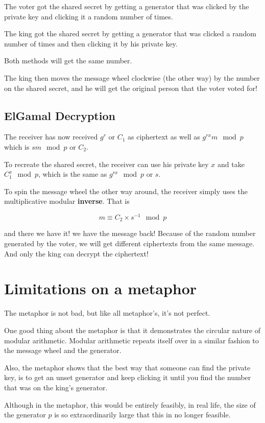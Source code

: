\documentclass{article}
\begin{document}
  The voter got the shared secret by getting a generator that was clicked by
  the private key and clicking it a random number of times.

  The king got the shared secret by getting a generator that was clicked a 
  random number of times and then clicking it by his private key.

  Both methods will get the same number.

  The king then moves the message wheel clockwise (the other way) by the number on the shared
  secret, and he will get the original person that the voter voted for!

  \subsection*{ElGamal Decryption}
  The receiver has now received $g^r$ or $C_1$ as ciphertext as well as $g^{rx} m \mod p$
  which is $sm \mod p$ or $C_2$.

  To recreate the shared secret, the receiver can use his private key $x$ and
  take $C_1^x \mod p$, which is the same as $g^{rx} \mod p$ or $s$.
  
  To spin the message wheel the other way around, the receiver simply uses the
  multiplicative modular \textbf{inverse}. That is

  \[ m \equiv C_2 \times s^{-1} \mod p \]

  and there we have it! we have the message back! Because of the random number
  generated by the voter, we will get different ciphertexts from the same message.
  And only the king can decrypt the ciphertext!

  \section*{Limitations on a metaphor}
  The metaphor is not bad, but like all metaphor's, it's not perfect.
  
  One good thing about the metaphor is that it demonstrates the circular nature
  of modular arithmetic. Modular arithmetic repeats itself over in a similar 
  fashion to the message wheel and the generator.
  
  Also, the metaphor shows that the
  best way that someone can find the private key, is to get an unset generator
  and keep clicking it until you find the number that was on the king's generator.

  Although in the metaphor, this would be entirely feasibly, in real life, the
  size of the generator $p$ is so extraordinarily large that this in no longer
  feasible.
\end{document}
